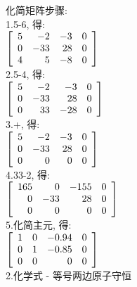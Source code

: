 化简矩阵步骤:\\
1.5-6, 得:\\
$\displaystyle\left[\begin{array}{r r r r}
    5 & -2 & -3 & 0\\
    0 & -33 & 28 & 0\\
    4 & 5 & -8 & 0
\end{array}\right]$\\

2.5-4, 得:\\
$\displaystyle\left[\begin{array}{r r r r}
    5 & -2 & -3 & 0\\
    0 & -33 & 28 & 0\\
    0 & 33 & -28 & 0
\end{array}\right]$\\

3.+, 得:\\
$\displaystyle\left[\begin{array}{r r r r}
    5 & -2 & -3 & 0\\
    0 & -33 & 28 & 0\\
    0 & 0 & 0 & 0
\end{array}\right]$\\

4.33-2, 得:\\
$\displaystyle\left[\begin{array}{r r r r}
    165 & 0 & -155 & 0\\
    0 & -33 & 28 & 0\\
    0 & 0 & 0 & 0
\end{array}\right]$\\

5.化简主元, 得:\\
$\displaystyle\left[\begin{array}{r r r r}
    1 & 0 & -0.94 & 0\\
    0 & 1 & -0.85 & 0\\
    0 & 0 & 0 & 0
\end{array}\right]$\\[2ex]

2.化学式 - 等号两边原子守恒\\[2ex]

